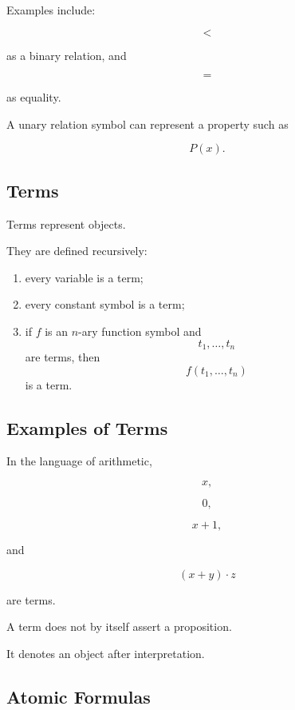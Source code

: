 Examples include:

\[
\boxed{
<
}
\]

as a binary relation, and

\[
\boxed{
=
}
\]

as equality.

A unary relation symbol can represent a property such as

\[
\boxed{
P(x).
}
\]

\subsection{Terms}
\label{subsec:first-order-terms}

Terms represent objects.

They are defined recursively:

\begin{enumerate}
    \item every variable is a term;
    \item every constant symbol is a term;
    \item if \(f\) is an \(n\)-ary function symbol and
    \[
    t_1,\ldots,t_n
    \]
    are terms, then
    \[
    \boxed{
    f(t_1,\ldots,t_n)
    }
    \]
    is a term.
\end{enumerate}

\subsection{Examples of Terms}
\label{subsec:first-order-term-examples}

In the language of arithmetic,

\[
x,
\]

\[
0,
\]

\[
x+1,
\]

and

\[
(x+y)\cdot z
\]

are terms.

A term does not by itself assert a proposition.

It denotes an object after interpretation.

\subsection{Atomic Formulas}
\label{subsec:atomic-formulas}


